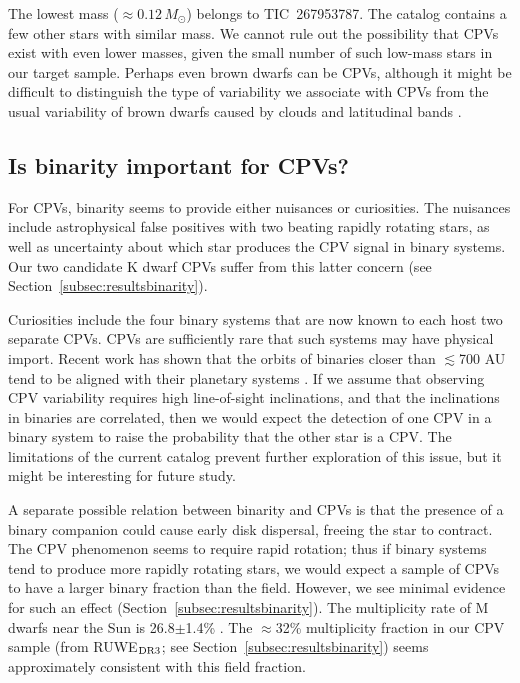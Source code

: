\documentclass[11pt,twocolumn,tighten,linenumbers]{aastex63}
\begin{document}
The lowest mass ($\approx$$0.12$\,$M_\odot$) belongs to TIC~267953787.
The catalog contains a few other stars with similar mass.  We cannot
rule out the possibility that CPVs exist with even lower masses, given
the small number of such low-mass stars in our target sample.  Perhaps
even brown dwarfs can be CPVs, although it might be difficult to
distinguish the type of variability we associate with CPVs from the
usual variability of brown dwarfs caused by clouds and latitudinal
bands \citep[e.g.][]{2021ApJ...906...64A,2022ApJ...924...68V}.



\subsection{Is binarity important for CPVs?}
\label{subsec:discbinary}

For CPVs, binarity seems to provide either nuisances or curiosities.
The nuisances include astrophysical false positives with two beating
rapidly rotating stars, as well as uncertainty about which star
produces the CPV signal in binary systems.  Our two candidate K dwarf
CPVs suffer from this latter concern (see
Section~\ref{subsec:resultsbinarity}).

Curiosities include the four binary systems that are now known to each
host two separate CPVs.  CPVs are sufficiently rare that such systems
may have physical import.  Recent work has shown that the orbits of
binaries closer than $\lesssim$700 AU tend to be aligned with their
planetary systems \citep[e.g.][]{2022AJ....163..207C}.  If we assume
that observing CPV variability requires high line-of-sight
inclinations, and that the inclinations in binaries are correlated,
then we would expect the detection of one CPV in a binary system to
raise the probability that the other star is a CPV.  The limitations
of the current catalog prevent further exploration of this issue, but
it might be interesting for future study.

A separate possible relation between binarity and CPVs is that the
presence of a binary companion could cause early disk dispersal,
freeing the star to contract.  The CPV phenomenon seems to require
rapid rotation; thus if binary systems tend to produce more rapidly
rotating stars, we would expect a sample of CPVs to have a larger
binary fraction than the field.  However, we see minimal evidence for
such an effect (Section~\ref{subsec:resultsbinarity}).  The
multiplicity rate of M dwarfs near the Sun is 26.8$\pm$1.4\%
\citep{2019AJ....157..216W}.  The $\approx$32\% multiplicity fraction
in our CPV sample (from RUWE$_{\rm DR3}$; see
Section~\ref{subsec:resultsbinarity}) seems approximately consistent
with this field fraction.
\end{document}
